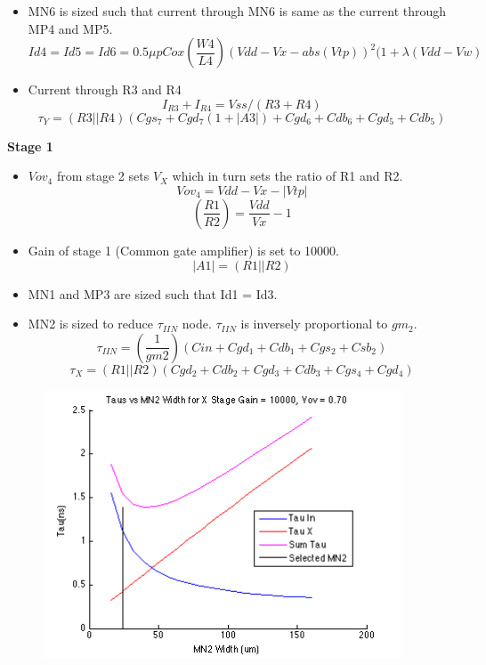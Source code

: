 \documentclass[12pt,a4paper]{article}
\begin{document}
\begin{itemize}
	\item MN6 is sized such that current through MN6 is same as the current through MP4 and MP5. 
	\begin{equation}
		Id4=Id5=Id6=0.5\mu pCox(\frac{W4}{L4})(Vdd-Vx-abs(Vtp))^{2} (1+\lambda (Vdd-Vw)
	\end{equation}
	\item Current through R3 and R4
	\begin{equation}
		I_{R3}+I_{R4}=Vss/(R3+R4)
	\end{equation}
	\begin{equation}
		\tau_Y=(R3 || R4)(Cgs_7+Cgd_7 (1+|A3|)+Cgd_6+Cdb_6+Cgd_5+Cdb_5)
	\end{equation}
\end{itemize}


\textbf{Stage 1}

\begin{itemize}
	\item $Vov_4$ from stage 2 sets $V_X$ which in turn sets the ratio of R1 and R2.
	\begin{equation}
		Vov_4=Vdd-Vx-|Vtp|
	\end{equation}
	\begin{equation}
		(\frac{R1}{R2})=\frac{Vdd}{Vx}-1
	\end{equation}
	\item Gain of stage 1 (Common gate amplifier) is set to 10000.
	\begin{equation}
		|A1|=(R1 || R2)
	\end{equation}
	\item MN1 and MP3 are sized such that Id1 = Id3.
	\item MN2 is sized to reduce $\tau_{IIN}$ node.  $\tau_{IIN}$ is inversely proportional to $gm_2$.
	\begin{equation}
		\tau_{IIN}=(\frac{1}{gm2})(Cin+Cgd_1+Cdb_1+Cgs_2+Csb_2)
	\end{equation}
	\begin{equation}
		\tau_{X}=(R1 || R2)(Cgd_2+Cdb_2+Cgd_3+Cdb_3+Cgs_4+Cgd_4)
	\end{equation}
\end{itemize}



\begin{figure}[h]
\centering
\includegraphics[width=10.63cm,height=7.99cm]{tau_i_x_vs_mn2.png}
\end{figure}
\end{document}
